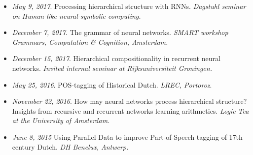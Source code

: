 \begin{itemize}
    \item \textit{May 9, 2017}. Processing hierarchical structure with RNNs.\textit{ Dagstuhl seminar on Human-like neural-symbolic computing.}
    \item \textit{December 7, 2017}. The grammar of neural networks. \textit{SMART workshop Grammars, Computation \& Cognition, Amsterdam.}
    \item \textit{December 15, 2017}. Hierarchical compositionality in recurrent neural networks. \textit{Invited internal seminar at Rijksuniversiteit Groningen.}
    \item \textit{May 25, 2016}. POS-tagging of Historical Dutch. \textit{LREC, Portoroz}.
    \item \textit{November 22, 2016}. How may neural networks process hierarchical structure? Insights from recursive and recurrent networks learning arithmetics. \textit{Logic Tea at the University of Amsterdam.}
    \item \textit{June 8, 2015} Using Parallel Data to improve Part-of-Speech tagging of 17th century Dutch. \textit{DH Benelux, Antwerp.}
\end{itemize}
